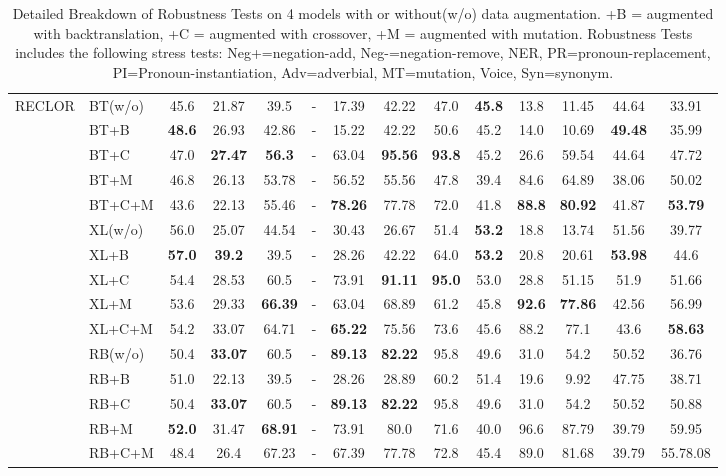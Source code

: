 \documentclass{ecai}  %
\begin{document}
\begin{table*}[th]
\begin{tabular}{ll|c|ccccccccccc}
	\midrule
\multirow{15}{*}{RECLOR} 

 		    
                &  BT(w/o) &45.6&21.87&39.5&-&17.39&42.22&47.0&\bf{45.8}&13.8&11.45&44.64&33.91
                						\\ 
		&  BT+B &\bf{48.6}&26.93&42.86&-&15.22&42.22&50.6&45.2&14.0&10.69&\bf{49.48}&35.99
 						        \\ 
		&  BT+C &47.0&\bf{27.47}&\bf{56.3}&-&63.04&\bf{95.56}&\bf{93.8}&45.2&26.6&59.54&44.64&47.72
 						        \\ 
		   & BT+M & 46.8&26.13&53.78&-&56.52&55.56&47.8&39.4&84.6&64.89&38.06&50.02
 						       \\ 
		   & BT+C+M& 43.6&22.13&55.46&-&\bf{78.26}&77.78&72.0&41.8&\bf{88.8}&\bf{80.92}&41.87&\bf{53.79}
		
 					     	       \\ \cmidrule{2-14}
		&  XL(w/o) &56.0&25.07&44.54&-&30.43&26.67&51.4&\bf{53.2}&18.8&13.74&51.56&39.77
                						\\ 
		&  XL+B & \bf{57.0}&\bf{39.2}&39.5&-&28.26&42.22&64.0&\bf{53.2}&20.8&20.61&\bf{53.98}&44.6
 						        \\ 
		&  XL+C & 54.4&28.53&60.5&-&73.91&\bf{91.11}&\bf{95.0}&53.0&28.8&51.15&51.9&51.66
							
 						        \\ 
		   & XL+M &53.6&29.33&\bf{66.39}&-&63.04&68.89&61.2&45.8&\bf{92.6}&\bf{77.86}&42.56 	&56.99				       \\ 
		   & XL+C+M& 54.2&33.07&64.71&-&\bf{65.22}&75.56&73.6&45.6&88.2&77.1&43.6&\bf{58.63}
 					     	       \\ \cmidrule{2-14}
	&  RB(w/o) & 50.4&\bf{33.07}&60.5&-&\bf{89.13}&\bf{82.22}&95.8&49.6&31.0&54.2&50.52&36.76
                						\\ 
		&  RB+B & 51.0&22.13&39.5&-&28.26&28.89&60.2&51.4&19.6&9.92&47.75&38.71
 						        \\ 
		&  RB+C & 50.4&\bf{33.07}&60.5&-&\bf{89.13}&\bf{82.22}&95.8&49.6&31.0&54.2&50.52&50.88
 						        \\ 
		   & RB+M &\bf{52.0}&31.47&\bf{68.91}&-&73.91&80.0&71.6&40.0&96.6&87.79&39.79&59.95
 						       \\ 
		   & RB+C+M&48.4&26.4&67.23&-&67.39&77.78&72.8&45.4&89.0&81.68&39.79&55.78.08
 					     	       \\ 


\bottomrule
\hline
\end{tabular}
\caption{\label{tab:results} Detailed Breakdown of Robustness Tests
on 4 models with or without(w/o) data augmentation. 
+B = augmented with backtranslation,
+C = augmented with crossover, +M = augmented with mutation. 
Robustness Tests includes the following stress tests: 
Neg+=negation-add, Neg-=negation-remove, NER, 
PR=pronoun-replacement, PI=Pronoun-instantiation, Adv=adverbial, MT=mutation, Voice, Syn=synonym.}
\end{table*}
\end{document}
